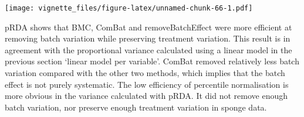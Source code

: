 \documentclass[]{book}
\newenvironment{Shaded}{\begin{snugshade}}{\end{snugshade}}
\newcommand{\KeywordTok}[1]{\textcolor[rgb]{0.13,0.29,0.53}{\textbf{#1}}}
\newcommand{\DataTypeTok}[1]{\textcolor[rgb]{0.13,0.29,0.53}{#1}}
\newcommand{\DecValTok}[1]{\textcolor[rgb]{0.00,0.00,0.81}{#1}}
\newcommand{\FloatTok}[1]{\textcolor[rgb]{0.00,0.00,0.81}{#1}}
\newcommand{\StringTok}[1]{\textcolor[rgb]{0.31,0.60,0.02}{#1}}
\newcommand{\OperatorTok}[1]{\textcolor[rgb]{0.81,0.36,0.00}{\textbf{#1}}}
\newcommand{\NormalTok}[1]{#1}
\begin{document}
\begin{Shaded}
\end{Shaded}

\texttt{[image: vignette\_files/figure-latex/unnamed-chunk-66-1.pdf]}

pRDA shows that BMC, ComBat and removeBatchEffect were more efficient at
removing batch variation while preserving treatment variation. This
result is in agreement with the proportional variance calculated using a
linear model in the previous section `linear model per variable'. ComBat
removed relatively less batch variation compared with the other two
methods, which implies that the batch effect is not purely systematic.
The low efficiency of percentile normalisation is more obvious in the
variance calculated with pRDA. It did not remove enough batch variation,
nor preserve enough treatment variation in sponge data.
\end{document}
